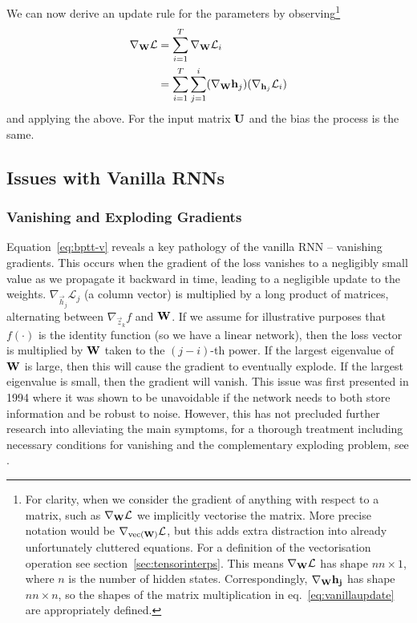 We can now derive an update rule for the parameters by observing\footnote{For clarity, when we
consider the gradient of anything with respect to a matrix, such as \(\nabla_{\mathbf{W}}\mathcal{L}\)
we implicitly vectorise the matrix. More precise notation would be
\(\nabla_{\operatorname{vec}(\mathbf{W})}\mathcal{L}\), but this adds extra distraction into already unfortunately
 cluttered equations. For a definition of the vectorisation operation see 
section~\ref{sec:tensorinterps}. This means \(\nabla_{\mathbf{W}}\mathcal{L}\) has shape \(nn \times 1\),
where \(n\) is the number of hidden states. Correspondingly, \(\nabla_{\mathbf{W}}\mathbf{h_j}\) has
shape \(nn \times n\), so the shapes of the matrix multiplication in eq.~\eqref{eq:vanillaupdate}
are appropriately defined.
}
\begin{align}
	\nabla_{\mathbf{W}} \mathcal{L} &= \sum_{i=1}^T \nabla_{\mathbf{W}} \mathcal{L}_i \\
	&= \sum_{i=1}^T\sum_{j=1}^i(\nabla_{\mathbf{W}} \mathbf{h}_j)(\nabla_{\mathbf{h}_j} \mathcal{L}_i )
	\label{eq:vanillaupdate}
\end{align} 
and applying the above. For the input matrix \(\mathbf{U}\) and the bias the process is the same.

\subsection{Issues with Vanilla RNNs}
\subsubsection{Vanishing and Exploding Gradients}
Equation~\eqref{eq:bptt-v} reveals a key pathology of the vanilla RNN -- vanishing gradients.
This occurs when the gradient of the loss vanishes to a negligibly small value as we
propagate it backward in time, leading to a negligible update to the weights.
 \(\nabla_{\vec{h}_j}\mathcal{L}_j\) (a column vector) is multiplied by a long product of
 matrices, alternating between \(\nabla_{\vec{z}_k} f\) and \(\mathbf{W}\). If we assume for
 illustrative purposes that \(f(\cdot)\) is the identity function (so we have a linear network),
then the loss vector is multiplied by \(\mathbf{W}\) taken to the \((j-i)\)-th power. If the largest
eigenvalue of \(\mathbf{W}\) is large, then this will cause the gradient to eventually explode.
If the largest eigenvalue is small, then the gradient will vanish. This issue was first presented
in 1994 \autocite{Bengio1994} where it was shown to be unavoidable if the network needs to both store
information and be robust to noise. However, this has not precluded further research into alleviating
the main symptoms, for a thorough treatment including necessary conditions 
for vanishing and the complementary exploding problem, see \autocite{Pascanu2012}.

